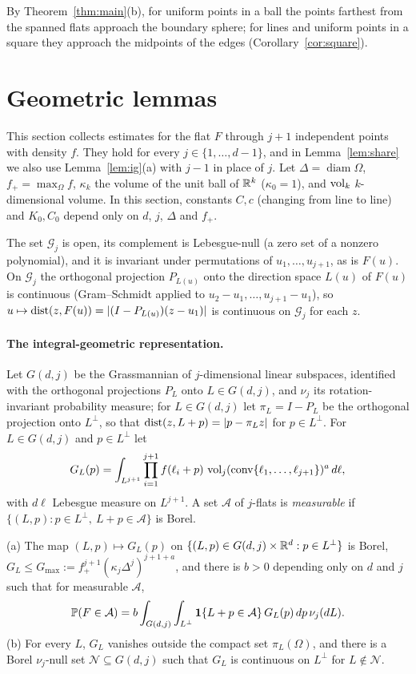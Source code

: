 \documentclass[11pt]{article}
\begin{document}
By Theorem~\ref{thm:main}(b), for uniform points in a ball the points farthest from the spanned flats approach the boundary sphere;
for lines and uniform points in a square they approach the midpoints of the edges (Corollary~\ref{cor:square}).

\section{Geometric lemmas}\label{sec:geom}

This section collects estimates for the flat $F$ through $j+1$ independent points with density $f$. They hold for every
$j\in\{1,\dots,d-1\}$, and in Lemma~\ref{lem:share} we also use Lemma~\ref{lem:ig}(a) with $j-1$ in place of $j$. Let
$\Delta=\operatorname{diam}\Omega$, $f_+=\max_\Omega f$, $\kappa_k$ the volume of the unit ball of $\mathbb{R}^k$ ($\kappa_0=1$), and $\operatorname{vol}_k$
$k$-dimensional volume. In this section, constants $C,c$ (changing from line to line) and $K_0,C_0$ depend only on $d$, $j$, $\Delta$
and $f_+$.

The set $\mathcal G_j$ is open, its complement is Lebesgue-null (a zero set of a nonzero polynomial), and it is invariant under
permutations of $u_1,\dots,u_{j+1}$, as is $F(u)$. On $\mathcal G_j$ the orthogonal projection $P_{L(u)}$ onto the direction space
$L(u)$ of $F(u)$ is continuous (Gram--Schmidt applied to $u_2-u_1,\dots,u_{j+1}-u_1$), so $u\mapsto\operatorname{dist}(z,F(u))=|(I-P_{L(u)})(z-u_1)|$
is continuous on $\mathcal G_j$ for each $z$.

\paragraph{The integral-geometric representation.} Let $G(d,j)$ be the Grassmannian of $j$-dimensional linear subspaces,
identified with the orthogonal projections $P_L$ onto $L\in G(d,j)$, and $\nu_j$ its rotation-invariant probability measure; for
$L\in G(d,j)$ let $\pi_L=I-P_L$ be the orthogonal projection onto $L^\perp$, so that $\operatorname{dist}(z,L+p)=|p-\pi_Lz|$ for $p\in L^\perp$.
For $L\in G(d,j)$ and $p\in L^\perp$ let
\[
  G_L(p)=\int_{L^{j+1}}\prod_{i=1}^{j+1}f(\ell_i+p)\,\operatorname{vol}_j(\operatorname{conv}\{\ell_1,\dots,\ell_{j+1}\})^a\,d\ell ,
\]
with $d\ell$ Lebesgue measure on $L^{j+1}$. A set $\mathcal A$ of $j$-flats is \emph{measurable} if
$\{(L,p):p\in L^\perp,\ L+p\in\mathcal A\}$ is Borel.

\begin{lemma}[Representation]\label{lem:rep}
(a) The map $(L,p)\mapsto G_L(p)$ on $\{(L,p)\in G(d,j)\times\mathbb{R}^d:p\in L^\perp\}$ is Borel, $G_L\le G_{\max}:=f_+^{j+1}(\kappa_j\Delta^j)^{j+1+a}$, and
there is $b>0$ depending only on $d$ and $j$ such that for measurable $\mathcal A$,
\begin{equation}\label{eq:BPj}
  \mathbb{P}(F\in\mathcal A)=b\int_{G(d,j)}\int_{L^\perp}\mathbf{1}\{L+p\in\mathcal A\}\,G_L(p)\,dp\,\nu_j(dL).
\end{equation}
(b) For every $L$, $G_L$ vanishes outside the compact set $\pi_L(\Omega)$, and there is a Borel $\nu_j$-null set $\mathcal N\subseteq G(d,j)$
such that $G_L$ is continuous on $L^\perp$ for $L\notin\mathcal N$.
\end{lemma}
\end{document}
